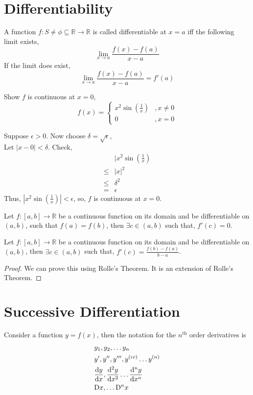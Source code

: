 	\section{Differentiability}
	\begin{theorem}
		A function $f: S\neq \phi \subseteq \mathbb{R}\to \mathbb{R}$ is called differentiable at $x=a$ iff the following limit exists,
		\[\lim\limits_{x\to a}\frac{f(x)-f(a)}{x-a}\]
		If the limit does exist,
		\[\lim\limits_{x\to a}\frac{f(x)-f(a)}{x-a}=f'(a)\]
	\end{theorem}
	\begin{eg}
		Show $f$ is continuous at $x=0$,
		\[f(x)=\begin{cases}
			x^2\sin(\frac{1}{x}) &, x\neq 0\\
			0 &, x=0
		\end{cases}\]
	\end{eg}
	\begin{explanation}
		Suppose $\epsilon>0$. Now choose $\delta=\sqrt{\epsilon}$,\\
		Let $|x-0|<\delta$.
		Check,
		\[\begin{split}
			&|x^2\sin(\frac{1}{x})\\
			\leq & |x|^2\\
			\leq &\delta^2\\
			=& \epsilon
		\end{split}\]
		Thus, $|x^2\sin(\frac{1}{x})|<\epsilon$, so, $f$ is continuous at $x=0$.
	\end{explanation}
	\begin{theorem}
		Let $f:[a,b]\to\mathbb{R}$ be a continuous function on its domain and be differentiable on $(a,b)$, such that $f(a)=f(b)$, then $\exists c\in(a,b)$ such that, $f'(c)=0$.
	\end{theorem}
	\begin{theorem}
		Let $f:[a,b]\to\mathbb{R}$ be a continuous function on its domain and be differentiable on $(a,b)$, then $\exists c\in(a,b)$ such that, $f'(c)=\frac{f(b)-f(a)}{b-a}$.
	\end{theorem}
	\begin{proof}
		We can prove this using Rolle's Theorem. It is an extension of Rolle's Theorem.
	\end{proof}
	
	\section{Successive Differentiation}
	Consider a function $y=f(x)$, then the notation for the $n^\text{th}$ order derivatives is
	\[\begin{split}
	& y_1, y_2, \ldots y_n\\
	& y', y'', y''', y^{(iv)} \ldots y^{(n)}\\
	& \dv{y}{x}, \dv[2]{y}{x} \ldots \dv[n]{y}{x}\\
	& \mathrm{D}x, \dots \mathrm{D}^n x
	\end{split}\]

